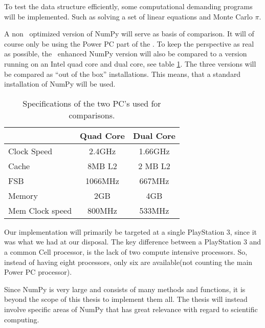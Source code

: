To test the data structure efficiently, some computational demanding
programs will be implemented. Such as solving a set of linear
equations and Monte Carlo $\pi$.

A non \CBE\ optimized version of NumPy will serve as basis of
comparison. It will of course only be using the Power PC part of
the \CBE{}. To keep the perspective as real as possible,
the \CBE\ enhanced NumPy version will also be compared to a version
running on an Intel quad core and dual core, see
table \ref{tbl:setup}. The three versions will be compared as ``out of
the box'' installations. This means, that a standard installation of
NumPy will be used.

\begin{table}
\begin{center}
\begin{tabular}{|l|c|c|}
\hline
                & Quad Core & Dual Core \\
\hline
Clock Speed     & 2.4GHz    & 1.66GHz   \\
Cache           & 8MB L2    & 2 MB L2   \\
FSB             & 1066MHz   & 667MHz    \\
Memory          & 2GB       & 4GB       \\
Mem Clock speed & 800MHz    & 533MHz    \\
\hline
\end{tabular}
\caption{Specifications of the two PC's used for comparisons.\label{tbl:setup}}
\end{center}
\end{table}

Our implementation will primarily be targeted at a single PlayStation
3, since it was what we had at our disposal. The key difference
between a PlayStation 3 and a common Cell processor, is the lack of
two compute intensive processors. So, instead of having eight processors, only
six are available(not counting the main Power PC processor).


Since NumPy is very large and consists of many methods and functions,
it is beyond the scope of this thesis to implement them all. The
thesis will instead involve specific areas of NumPy that has great
relevance with regard to scientific computing.


